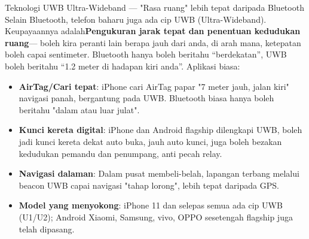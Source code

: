 \begin{tcbinfo}{Teknologi UWB Ultra-Wideband — "Rasa ruang" lebih tepat daripada Bluetooth}
Selain Bluetooth, telefon baharu juga ada cip UWB (Ultra-Wideband). Keupayaannya adalah\textbf{Pengukuran jarak tepat dan penentuan kedudukan ruang}— boleh kira peranti lain berapa jauh dari anda, di arah mana, ketepatan boleh capai sentimeter. Bluetooth hanya boleh beritahu “berdekatan”, UWB boleh beritahu “1.2 meter di hadapan kiri anda”. Aplikasi biasa:

\begin{itemize}
  \item \textbf{AirTag/Cari tepat}: iPhone cari AirTag papar "7 meter jauh, jalan kiri" navigasi panah, bergantung pada UWB. Bluetooth biasa hanya boleh beritahu "dalam atau luar julat".
  \item \textbf{Kunci kereta digital}: iPhone dan Android flagship dilengkapi UWB, boleh jadi kunci kereta dekat auto buka, jauh auto kunci, juga boleh bezakan kedudukan pemandu dan penumpang, anti pecah relay.
  \item \textbf{Navigasi dalaman}: Dalam pusat membeli-belah, lapangan terbang melalui beacon UWB capai navigasi "tahap lorong", lebih tepat daripada GPS.
  \item \textbf{Model yang menyokong}: iPhone 11 dan selepas semua ada cip UWB (U1/U2); Android Xiaomi, Samsung, vivo, OPPO sesetengah flagship juga telah dipasang.
\end{itemize}

\end{tcbinfo}


